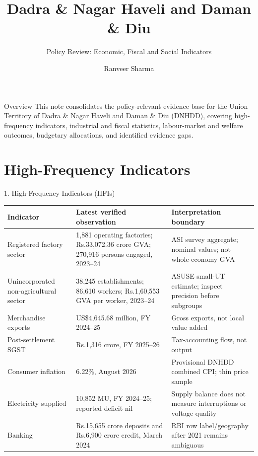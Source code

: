 \documentclass[aspectratio=169,11pt]{beamer}
\title{Dadra \& Nagar Haveli and Daman \& Diu}
\subtitle{Policy Review: Economic, Fiscal and Social Indicators}
\author{Ranveer Sharma}
\date{}
\renewcommand{\arraystretch}{1.12}
\newcommand{\smalltable}{\scriptsize\setlength{\tabcolsep}{2.5pt}\renewcommand{\arraystretch}{1.08}}
\begin{document}
\begin{frame}\titlepage\end{frame}

\begin{frame}{Overview}
This note consolidates the policy-relevant evidence base for the Union Territory of Dadra \& Nagar Haveli and Daman \& Diu (DNHDD), covering high-frequency indicators, industrial and fiscal statistics, labour-market and welfare outcomes, budgetary allocations, and identified evidence gaps.
\end{frame}

\section{High-Frequency Indicators}
\begin{frame}{1. High-Frequency Indicators (HFIs)}\smalltable
\begin{tabularx}{\textwidth}{p{}p{}Y}\toprule
Indicator & Latest verified observation & Interpretation boundary\\\midrule
Registered factory sector & 1,881 operating factories; Rs.33,072.36 crore GVA; 270,916 persons engaged, 2023--24 & ASI survey aggregate; nominal values; not whole-economy GVA\\
Unincorporated non-agricultural sector & 38,245 establishments; 86,610 workers; Rs.1,60,553 GVA per worker, 2023--24 & ASUSE small-UT estimate; inspect precision before subgroups\\
Merchandise exports & US\$4,645.68 million, FY 2024--25 & Gross exports, not local value added\\
Post-settlement SGST & Rs.1,316 crore, FY 2025--26 & Tax-accounting flow, not output\\
Consumer inflation & 6.22\%, August 2026 & Provisional DNHDD combined CPI; thin price sample\\
Electricity supplied & 10,852 MU, FY 2024--25; reported deficit nil & Supply balance does not measure interruptions or voltage quality\\
Banking & Rs.15,655 crore deposits and Rs.6,900 crore credit, March 2024 & RBI row label/geography after 2021 remains ambiguous\\
\bottomrule\end{tabularx}
\end{frame}
\end{document}
